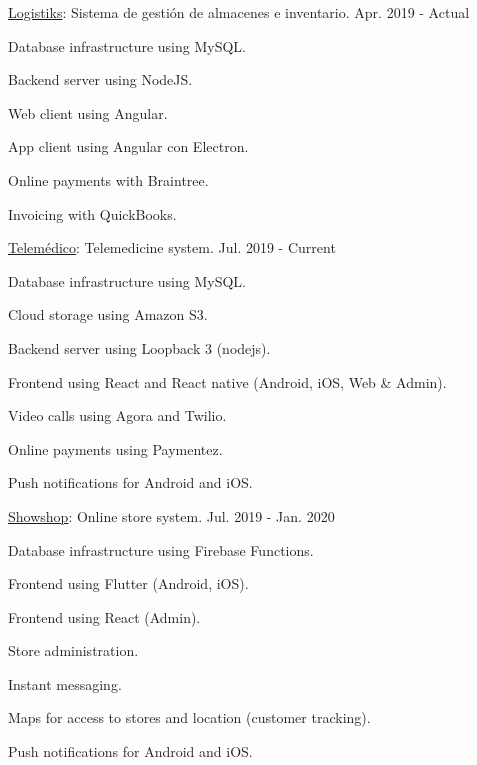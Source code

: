 \begin{cventries}
  \cventry
    {\href{https://logistiksusa.com/}{Logistiks}: Sistema de gestión de almacenes e inventario.} %
    {} %
    {} %
    {Apr. 2019 - Actual} %
    {
      \begin{cvitems} %
        \item {Database infrastructure using MySQL.}
        \item {Backend server using NodeJS.}
        \item {Web client using Angular.}
        \item {App client using Angular con Electron.}
        \item {Online payments with Braintree.}
        \item {Invoicing with QuickBooks.}
      \end{cvitems}
    }

  \cventry
    {\href{https://telemedico.com.ec/}{Telemédico}: Telemedicine system.} %
    {} %
    {} %
    {Jul. 2019 - Current} %
    {
      \begin{cvitems} %
        \item {Database infrastructure using MySQL.}
        \item {Cloud storage using Amazon S3.}
        \item {Backend server using Loopback 3 (nodejs).}
        \item {Frontend using React and React native (Android, iOS, Web \& Admin).}
        \item {Video calls using Agora and Twilio.}
        \item {Online payments using Paymentez.}
        \item {Push notifications for Android and iOS.}
      \end{cvitems}
    }

  \cventry
    {\href{https://showshop.app/}{Showshop}: Online store system.} %
    {} %
    {} %
    {Jul. 2019 - Jan. 2020} %
    {
      \begin{cvitems} %
        \item {Database infrastructure using Firebase Functions.}
        \item {Frontend using Flutter (Android, iOS).}
        \item {Frontend using React (Admin).}
        \item {Store administration.}
        \item {Instant messaging.}
        \item {Maps for access to stores and location (customer tracking).}
        \item {Push notifications for Android and iOS.}
      \end{cvitems}
    }


\end{cventries}
